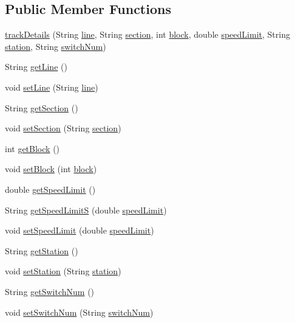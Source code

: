 \subsection*{Public Member Functions}
\begin{DoxyCompactItemize}
\item 
\hyperlink{classtrackDetails_a3cae5dfd3207dce4756ce2f0353a5763}{track\+Details} (String \hyperlink{classtrackDetails_a8b79c0cfb50c7468da12fa27136ad405}{line}, String \hyperlink{classtrackDetails_ab792824f4e3b7a384dd6edd2477a71e4}{section}, int \hyperlink{classtrackDetails_a13669b99469f4b78df534fbb72f4143d}{block}, double \hyperlink{classtrackDetails_a1d5bd79ee0bb744bec31e83a3d2895dd}{speed\+Limit}, String \hyperlink{classtrackDetails_ac7e67717763b308bcab1b1103f9aa1f7}{station}, String \hyperlink{classtrackDetails_a505f97a602c160591e64664790ca4e5b}{switch\+Num})
\item 
String \hyperlink{classtrackDetails_a1d44908db14b13943285cb96a2650f39}{get\+Line} ()
\item 
void \hyperlink{classtrackDetails_a4d6a369eef1fac06475277177369d6a3}{set\+Line} (String \hyperlink{classtrackDetails_a8b79c0cfb50c7468da12fa27136ad405}{line})
\item 
String \hyperlink{classtrackDetails_a6015cc578bd221d08f86e7149bc628d4}{get\+Section} ()
\item 
void \hyperlink{classtrackDetails_a7eaba9d9e69088bec45012a062fa594a}{set\+Section} (String \hyperlink{classtrackDetails_ab792824f4e3b7a384dd6edd2477a71e4}{section})
\item 
int \hyperlink{classtrackDetails_ace170128a164913c83f3cba25dda135f}{get\+Block} ()
\item 
void \hyperlink{classtrackDetails_a156625126ad75671296575c9abb60299}{set\+Block} (int \hyperlink{classtrackDetails_a13669b99469f4b78df534fbb72f4143d}{block})
\item 
double \hyperlink{classtrackDetails_ad98f82166c38d18a0b5ce5b58f302a35}{get\+Speed\+Limit} ()
\item 
String \hyperlink{classtrackDetails_a8857c7e4a957d7fe39d1e38dc090f3e1}{get\+Speed\+LimitS} (double \hyperlink{classtrackDetails_a1d5bd79ee0bb744bec31e83a3d2895dd}{speed\+Limit})
\item 
void \hyperlink{classtrackDetails_a0b6bfc44b0d1613b769fb77c8fcb70b3}{set\+Speed\+Limit} (double \hyperlink{classtrackDetails_a1d5bd79ee0bb744bec31e83a3d2895dd}{speed\+Limit})
\item 
String \hyperlink{classtrackDetails_af4717e6aa7ccfa4e5e477d61a58b0830}{get\+Station} ()
\item 
void \hyperlink{classtrackDetails_a55dc6c094eaf9091c40f88c570bb5964}{set\+Station} (String \hyperlink{classtrackDetails_ac7e67717763b308bcab1b1103f9aa1f7}{station})
\item 
String \hyperlink{classtrackDetails_af3e64ab27ae22ea6db064dca52da01ea}{get\+Switch\+Num} ()
\item 
void \hyperlink{classtrackDetails_a12c839239d3bf567b166ad5e71dd88b7}{set\+Switch\+Num} (String \hyperlink{classtrackDetails_a505f97a602c160591e64664790ca4e5b}{switch\+Num})
\end{DoxyCompactItemize}
